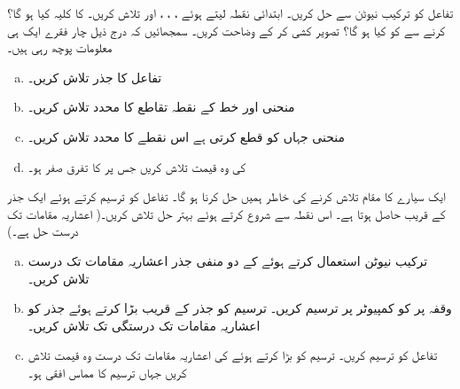 \quad
تفاعل  کو ترکیب نیوٹن سے حل کریں۔ ابتدائی نقطہ  لیتے ہوئے ، ، ،  اور  تلاش کریں۔  کا کلیہ کیا ہو گا؟   کرنے سے  کو کیا ہو گا؟ تصویر کشی کر کے وضاحت کریں۔
سمجھائیں کہ درج ذیل چار فقرے ایک ہی معلومات پوچھ رہی ہیں۔
\begin{enumerate}[a.]
\item
تفاعل  کا جذر تلاش کریں۔
\item
منحنی  اور خط  کے  نقطہ تقاطع کا  محدد تلاش کریں۔ 
\item
منحنی  جہاں کو قطع کرتی ہے اس نقطے کا  محدد تلاش کریں۔
\item
{} کی وہ قیمت تلاش کریں جس پر  کا تفرق صفر ہو۔
\end{enumerate}
ایک سیارے کا مقام تلاش کرنے کی خاطر  ہمیں  حل کرنا ہو گا۔ تفاعل  کو ترسیم کرتے ہوئے ایک جذر  کے قریب حاصل ہوتا ہے۔ اس نقطہ سے شروع کرتے ہوئے بہتر حل  تلاش کریں۔(  اعشاریہ مقامات تک درست حل   ہے۔)
\begin{enumerate}[a.]
\item
ترکیب نیوٹن استعمال کرتے ہوئے  کے دو منفی جذر  اعشاریہ مقامات تک درست تلاش کریں۔
\item
وقفہ  پر  کو کمپیوٹر پر ترسیم  کریں۔ ترسیم کو جذر کے قریب بڑا کرتے ہوئے  جذر کو  اعشاریہ مقامات تک درستگی تک تلاش کریں۔
\item
تفاعل  کو ترسیم کریں۔ ترسیم کو بڑا کرتے ہوئے   کی  اعشاریہ مقامات تک درست وہ قیمت تلاش کریں جہاں ترسیم کا مماس افقی ہو۔
\end{enumerate}
